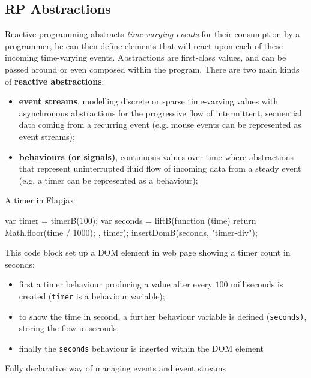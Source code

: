 \subsection{RP Abstractions}\label{sub:rp_rp_abstractions} %
Reactive programming abstracts \textit{time-varying events} for their consumption by a programmer, he can then define elements that will react upon each of these incoming time-varying events.
Abstractions are first-class values, and can be passed around or even composed within the program.
\emptyln{}
There are two main kinds of \textbf{reactive abstractions}:
\begin{itemize}
    \item \textbf{event streams}, modelling discrete or sparse time-varying values with asynchronous abstractions for the progressive flow of intermittent, sequential data coming from a recurring event (e.g. mouse events can be represented as event streams);
    \item \textbf{behaviours (or signals)}, continuous values over time where abstractions that represent uninterrupted fluid flow of incoming data from a steady event (e.g. a timer can be represented as a behaviour);
\end{itemize}
\begin{example}{A timer in Flapjax}{}
    \begin{codeblock}[js]{}
    var timer = timerB(100);
    var seconds = liftB(function (time) {
        return Math.floor(time / 1000);
    }, timer);
    insertDomB(seconds, "timer-div");
    \end{codeblock}
    This code block set up a DOM element in web page showing a timer count in seconds:
    \begin{itemize}
        \item first a timer behaviour producing a value after every $100$ milliseconds is created (\texttt{timer} is a behaviour variable);
        \item to show the time in second, a further behaviour variable is defined (\texttt{seconds)}, storing the flow in seconds;
        \item finally the \texttt{seconds} behaviour is inserted within the DOM element
    \end{itemize}
    \begin{note}
        Fully declarative way of managing events and event streams
    \end{note}
\end{example}
%
